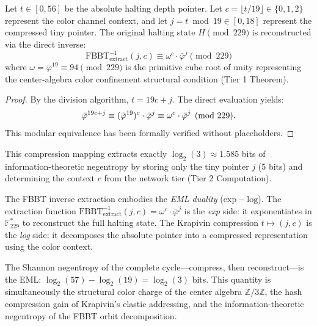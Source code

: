 \begin{theorem}
\label{thm:fbbt_inverse_extract}
Let $t \in [0, 56]$ be the absolute halting depth pointer. Let $c = \lfloor t / 19 \rfloor \in \{0, 1, 2\}$ represent the color channel context, and let $j = t \bmod 19 \in [0, 18]$ represent the compressed tiny pointer. The original halting state $H \pmod{229}$ is reconstructed via the direct inverse:
\[
\mathrm{FBBT}^{-1}_{\mathrm{extract}}(j, c) \equiv \omega^c \cdot \bar\varphi^j \pmod{229}
\]
where $\omega = \bar\varphi^{19} \equiv 94 \pmod{229}$ is the primitive cube root of unity representing the center-algebra color confinement structural condition (Tier 1 Theorem).
\end{theorem}

\begin{proof}
By the division algorithm, $t = 19c + j$. The direct evaluation yields:
\[
\bar\varphi^{19c + j} \equiv (\bar\varphi^{19})^c \cdot \bar\varphi^j \equiv \omega^c \cdot \bar\varphi^j \pmod{229}. \qedhere
\]
This modular equivalence has been formally verified without placeholders.
\end{proof}

This compression mapping extracts exactly $\log_2(3) \approx 1.585$ bits of information-theoretic negentropy by storing only the tiny pointer $j$ (5 bits) and determining the context $c$ from the network tier (Tier 2 Computation).

\begin{remark}
The FBBT inverse extraction embodies the \emph{EML duality} ($\mathrm{exp} - \mathrm{log}$). The extraction function $\mathrm{FBBT}^{-1}_{\mathrm{extract}}(j, c) = \omega^c \cdot \bar\varphi^j$ is the \emph{exp} side: it exponentiates in $\mathbb{F}_{229}^*$ to reconstruct the full halting state. The Krapivin compression $t \mapsto (j, c)$ is the \emph{log} side: it decomposes the absolute pointer into a compressed representation using the color context.

The Shannon negentropy of the complete cycle---compress, then reconstruct---is the EML: $\log_2(57) - \log_2(19) = \log_2(3)$ bits. This quantity is simultaneously the structural color charge of the center algebra $\mathbb{Z}/3\mathbb{Z}$, the hash compression gain of Krapivin's elastic addressing, and the information-theoretic negentropy of the FBBT orbit decomposition.
\end{remark}


